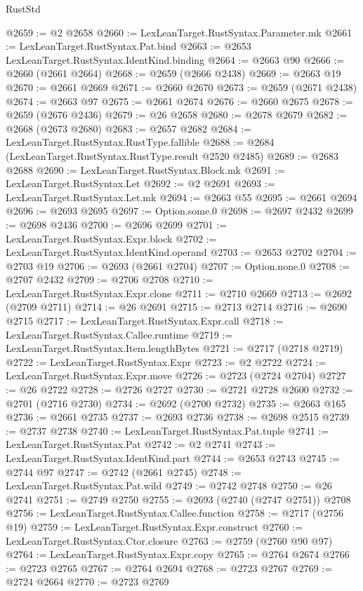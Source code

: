 \begin{lexlean}{RustStd}
\begin{coremodule}
@2659 := @2 @2658
@2660 := LexLeanTarget.RustSyntax.Parameter.mk
@2661 := LexLeanTarget.RustSyntax.Pat.bind
@2663 := @2653 LexLeanTarget.RustSyntax.IdentKind.binding
@2664 := @2663 @90
@2666 := @2660 (@2661 @2664)
@2668 := @2659 (@2666 @2438)
@2669 := @2663 @19
@2670 := @2661 @2669
@2671 := @2660 @2670
@2673 := @2659 (@2671 @2438)
@2674 := @2663 @97
@2675 := @2661 @2674
@2676 := @2660 @2675
@2678 := @2659 (@2676 @2436)
@2679 := @26 @2658
@2680 := @2678 @2679
@2682 := @2668 (@2673 @2680)
@2683 := @2657 @2682
@2684 := LexLeanTarget.RustSyntax.RustType.fallible
@2688 := @2684 (LexLeanTarget.RustSyntax.RustType.result @2520 @2485)
@2689 := @2683 @2688
@2690 := LexLeanTarget.RustSyntax.Block.mk
@2691 := LexLeanTarget.RustSyntax.Let
@2692 := @2 @2691
@2693 := LexLeanTarget.RustSyntax.Let.mk
@2694 := @2663 @55
@2695 := @2661 @2694
@2696 := @2693 @2695
@2697 := Option.some.{0}
@2698 := @2697 @2432
@2699 := @2698 @2436
@2700 := @2696 @2699
@2701 := LexLeanTarget.RustSyntax.Expr.block
@2702 := LexLeanTarget.RustSyntax.IdentKind.operand
@2703 := @2653 @2702
@2704 := @2703 @19
@2706 := @2693 (@2661 @2704)
@2707 := Option.none.{0}
@2708 := @2707 @2432
@2709 := @2706 @2708
@2710 := LexLeanTarget.RustSyntax.Expr.clone
@2711 := @2710 @2669
@2713 := @2692 (@2709 @2711)
@2714 := @26 @2691
@2715 := @2713 @2714
@2716 := @2690 @2715
@2717 := LexLeanTarget.RustSyntax.Expr.call
@2718 := LexLeanTarget.RustSyntax.Callee.runtime
@2719 := LexLeanTarget.RustSyntax.Item.lengthBytes
@2721 := @2717 (@2718 @2719)
@2722 := LexLeanTarget.RustSyntax.Expr
@2723 := @2 @2722
@2724 := LexLeanTarget.RustSyntax.Expr.move
@2726 := @2723 (@2724 @2704)
@2727 := @26 @2722
@2728 := @2726 @2727
@2730 := @2721 @2728 @2600
@2732 := @2701 (@2716 @2730)
@2734 := @2692 (@2700 @2732)
@2735 := @2663 @165
@2736 := @2661 @2735
@2737 := @2693 @2736
@2738 := @2698 @2515
@2739 := @2737 @2738
@2740 := LexLeanTarget.RustSyntax.Pat.tuple
@2741 := LexLeanTarget.RustSyntax.Pat
@2742 := @2 @2741
@2743 := LexLeanTarget.RustSyntax.IdentKind.part
@2744 := @2653 @2743
@2745 := @2744 @97
@2747 := @2742 (@2661 @2745)
@2748 := LexLeanTarget.RustSyntax.Pat.wild
@2749 := @2742 @2748
@2750 := @26 @2741
@2751 := @2749 @2750
@2755 := @2693 (@2740 (@2747 @2751)) @2708
@2756 := LexLeanTarget.RustSyntax.Callee.function
@2758 := @2717 (@2756 @19)
@2759 := LexLeanTarget.RustSyntax.Expr.construct
@2760 := LexLeanTarget.RustSyntax.Ctor.closure
@2763 := @2759 (@2760 @90 @97)
@2764 := LexLeanTarget.RustSyntax.Expr.copy
@2765 := @2764 @2674
@2766 := @2723 @2765
@2767 := @2764 @2694
@2768 := @2723 @2767
@2769 := @2724 @2664
@2770 := @2723 @2769

\end{coremodule}
\end{lexlean}
